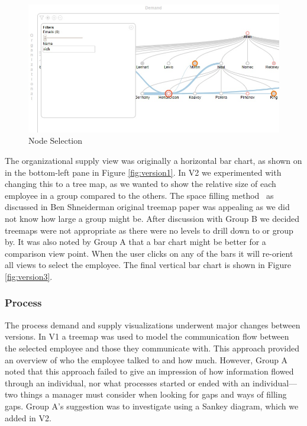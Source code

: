 \documentclass[journal]{vgtc}                %
\begin{document}
\begin{figure}
	\centering
	\includegraphics[width=\columnwidth]{pictures/orgdemand.jpg}
	\caption{Node Selection}
	\label{fig:node}
\end{figure}

The organizational supply view was originally a horizontal bar chart, as shown on in the bottom-left pane in Figure \ref{fig:version1}.  In V2 we experimented with changing this to a tree map, as we wanted to show the relative size of each employee in a group compared to the others.  The space filling method~\cite{shneiderman1992tree} as discussed in Ben Shneiderman original treemap paper was appealing as we did not know how large a group might be.  After discussion with Group B we decided treemaps were not appropriate as there were no levels to drill down to or group by.  It was also noted by Group A that a bar chart might be better for a comparison view point.  When the user clicks on any of the bars it will re-orient all views to select the employee.  The final vertical bar chart is shown in Figure \ref{fig:version3}.

\subsubsection{Process}

The process demand and supply visualizations underwent major changes between versions.  In V1 a treemap was used to model the communication flow between the selected employee and those they communicate with.  This approach provided an overview of who the employee talked to and how much. However, Group A noted that this approach failed to give an impression of how information flowed through an individual, nor what processes started or ended with an individual---two things a manager must consider when looking for gaps and ways of filling gaps.  Group A's suggestion was to investigate using a Sankey diagram, which we added in V2.
\end{document}
